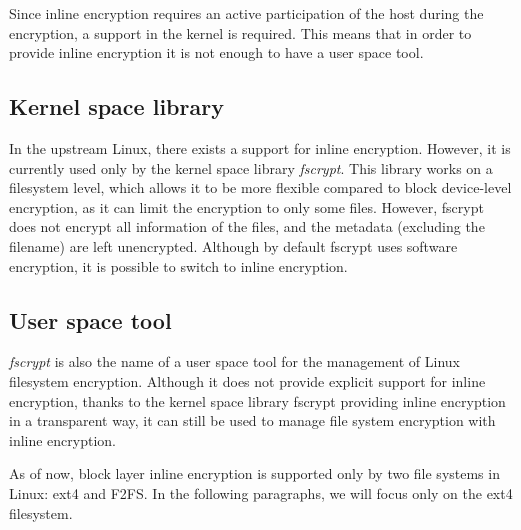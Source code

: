 Since inline encryption requires an active participation of the host during the encryption, a support in the kernel is required.
This means that in order to provide inline encryption it is not enough to have a user space tool.

\subsection{Kernel space library}

In the upstream Linux, there exists a support for inline encryption. However, it is currently used only by the kernel space library \emph{fscrypt}.
This library works on a filesystem level, which allows it to be more flexible compared to block device-level encryption, as it can limit the encryption to only some files. However, fscrypt does not encrypt all information of the files, and the metadata (excluding the filename) are left unencrypted.
Although by default fscrypt uses software encryption, it is possible to switch to inline encryption.



\subsection{User space tool}

\emph{fscrypt} is also the name of a user space tool for the management of Linux filesystem encryption. Although it does not provide explicit support for inline encryption, thanks to the kernel space library fscrypt providing inline encryption in a transparent way, it can still be used to manage file system encryption with inline encryption.


As of now, block layer inline encryption is supported only by two file systems in Linux: ext4 and F2FS. 
In the following paragraphs, we will focus only on the ext4 filesystem.

